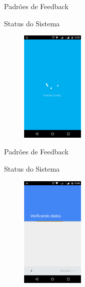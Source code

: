 \begin{frame}{Padrões de Feedback}
\begin{block}{Status do Sistema}
    \begin{figure}
    \includegraphics[width=3cm]{figuras/status/status1}
    \end{figure}
\end{block}
\end{frame}

\begin{frame}{Padrões de Feedback}
\begin{block}{Status do Sistema}
    \begin{figure}
    \includegraphics[width=3cm]{figuras/status/status2}
    \end{figure}
\end{block}
\end{frame}
